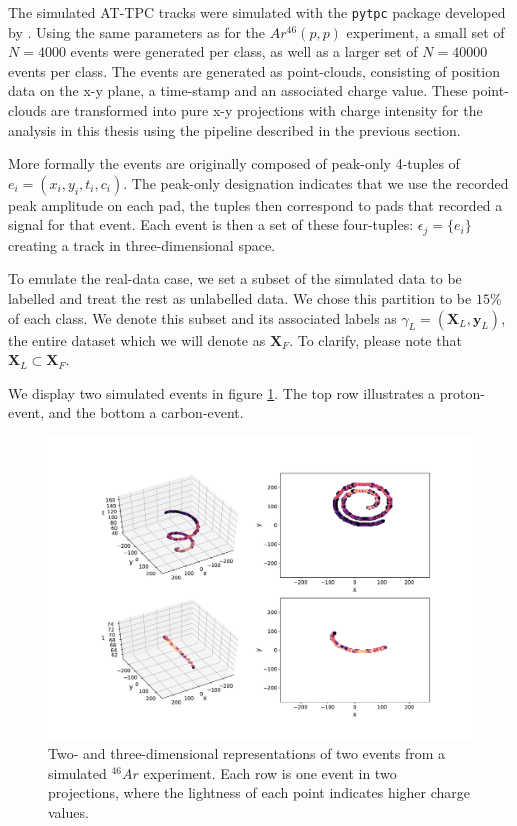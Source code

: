 The simulated AT-TPC tracks were simulated with the \lstinline{pytpc} package developed by \citet{Bradt2017a}. Using the same parameters as for the $Ar^{46}(p, p)$ experiment, a small set of $N=4000$ events were generated per class, as well as a larger set of $N=40000$ events per class. The events are generated as point-clouds, consisting of position data on the x-y plane, a time-stamp and an associated charge value. These point-clouds are transformed into pure x-y projections with charge intensity for the analysis in this thesis using the pipeline described in the previous section. 

More formally the events are originally composed of peak-only 4-tuples of $e_i = (x_i, y_i, t_i, c_i)$. The peak-only designation indicates that we use the recorded peak amplitude on each pad, the tuples then correspond to pads that recorded a signal for that event. Each event is then a set of these four-tuples: $\epsilon_j = \{e_i\}$ creating a track in three-dimensional space. 

To emulate the real-data case, we set a subset of the simulated data to be labelled and treat the rest as unlabelled data. We chose this partition to be $15\%$ of each class. We denote this subset and its associated labels as $\gamma_L=(\mathbf{X}_L, \mathbf{y}_L)$, the entire dataset which we will denote as $\mathbf{X}_F$. To clarify, please note that $\mathbf{X}_L \subset \mathbf{X}_F$.

We display two simulated events in figure \ref{fig:sim_samples}. The top row illustrates a proton-event, and the bottom a carbon-event. 

\begin{figure}[H]
\centering
\includegraphics[width=\textwidth]{../plots/display_eventssimulated.pdf}
\caption[Displaying simulated events in 2D and 3D]{Two- and three-dimensional representations of two events from a simulated ${}^{46}Ar$ experiment. Each row is one event in two projections, where the lightness of each point indicates higher charge values.}\label{fig:sim_samples}
\end{figure}


